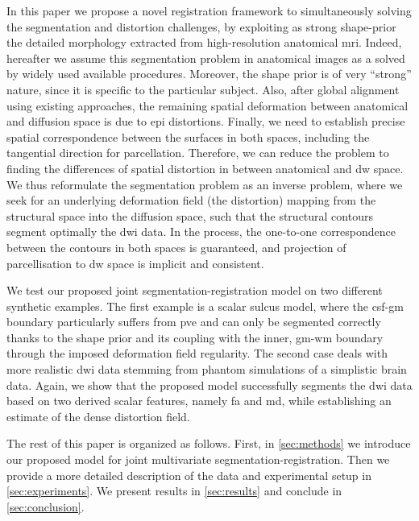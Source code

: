 In this paper we propose a novel registration framework to simultaneously
solving the segmentation and distortion challenges, by exploiting as strong 
shape-prior the detailed morphology extracted from high-resolution anatomical 
\gls{mri}. Indeed, hereafter we assume this segmentation problem in anatomical 
images as a solved by widely used available procedures.
Moreover, the shape prior is of very ``strong'' nature, since it is specific to 
the particular subject. Also, after global alignment using existing approaches, 
the remaining spatial deformation between anatomical and diffusion space is 
due to \gls{epi} distortions. Finally, we need to establish precise spatial 
correspondence between the surfaces in both spaces, including the tangential 
direction for parcellation. Therefore, we can reduce the problem to finding 
the differences of spatial distortion in between anatomical and \gls{dw} space.
We thus reformulate the segmentation problem as an inverse problem, where we 
seek for an underlying deformation field (the distortion) mapping 
from the structural space into the diffusion space, such that the structural 
contours segment optimally the \gls{dwi} data. In the process, the one-to-one 
correspondence between the contours in both spaces is guaranteed, and projection 
of parcellisation to \gls{dw} space is implicit and consistent.

We test our proposed joint segmentation-registration model on two different 
synthetic examples. The first example is a scalar sulcus model, where the 
\gls{csf}-\gls{gm} boundary particularly suffers from \gls{pve} and can only be 
segmented correctly thanks to the shape prior and its coupling with the inner, 
\gls{gm}-\gls{wm} boundary through the imposed deformation field regularity. 
The second case deals with more realistic \gls{dwi} data stemming from 
phantom simulations of a simplistic brain data. Again, we show that the 
proposed model successfully segments the \gls{dwi} data based on two derived 
scalar features, namely \gls{fa} and \gls{md}, while establishing an estimate 
of the dense distortion field.

The rest of this paper is organized as follows. First, in \autoref{sec:methods}
we introduce our proposed model for joint multivariate segmentation-registration.
Then we provide a more detailed description of the data and experimental setup in
\autoref{sec:experiments}. We present results in \autoref{sec:results} and conclude 
in \autoref{sec:conclusion}.